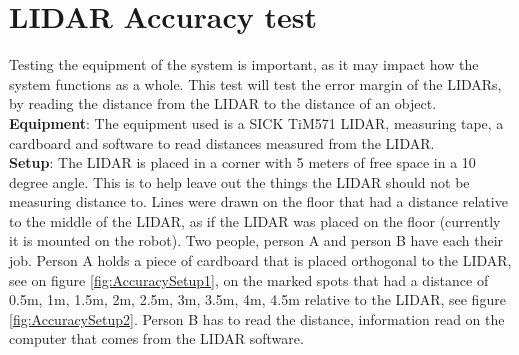 \section{LIDAR Accuracy test}
Testing the equipment of the system is important, as it may impact how the system functions as a whole. This test will test the error margin of the LIDARs, by reading the distance from the LIDAR to the distance of an object.\\

\textbf{Equipment}: The equipment used is a SICK TiM571 LIDAR, measuring tape, a cardboard and software to read distances measured from the LIDAR.\\
    
\textbf{Setup}: The LIDAR is placed in a corner with 5 meters of free space in a 10 degree angle. This is to help leave out the things the LIDAR should not be measuring distance to. Lines were drawn on the floor that had a distance relative to the middle of the LIDAR, as if the LIDAR was placed on the floor (currently it is mounted on the robot). Two people, person A and person B have each their job. Person A holds a piece of cardboard that is placed orthogonal to the LIDAR, see on figure \ref{fig:AccuracySetup1}, on the marked spots that had a distance of 0.5m, 1m, 1.5m, 2m, 2.5m, 3m, 3.5m, 4m, 4.5m relative to the LIDAR, see figure \ref{fig:AccuracySetup2}. Person B has to read the distance, information read on the computer that comes from the LIDAR software.

